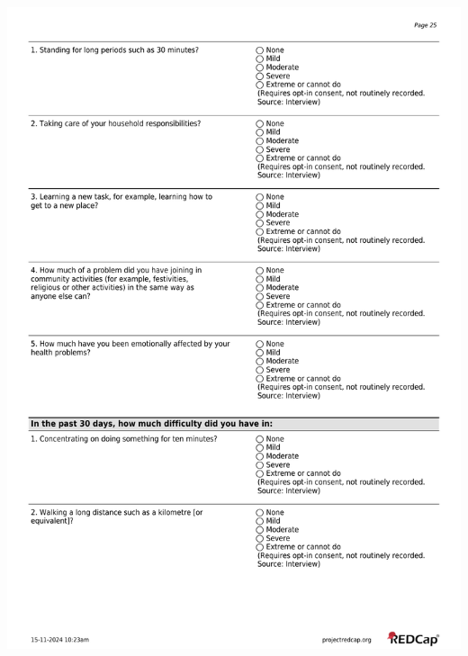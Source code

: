 \documentclass[
]{scrartcl}
\begin{document}
\includegraphics{../case-record-form/instrument-pdfs/pages/all-instruments-25.pdf}
\end{document}
